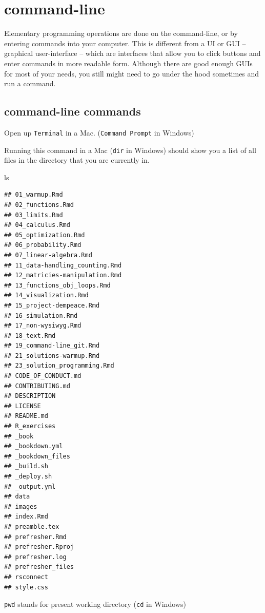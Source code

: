 \documentclass[
]{book}
\newenvironment{Shaded}{\begin{snugshade}}{\end{snugshade}}
\newcommand{\FunctionTok}[1]{\textcolor[rgb]{0.00,0.00,0.00}{#1}}
\theoremstyle{definition}
\theoremstyle{definition}
\theoremstyle{definition}
\theoremstyle{remark}
\begin{document}
\hypertarget{command-line}{%
\section{command-line}\label{command-line}}

Elementary programming operations are done on the command-line, or by entering commands into your computer. This is different from a UI or GUI -- graphical user-interface -- which are interfaces that allow you to click buttons and enter commands in more readable form. Although there are good enough GUIs for most of your needs, you still might need to go under the hood sometimes and run a command.

\hypertarget{command-line-commands}{%
\subsection{command-line commands}\label{command-line-commands}}

Open up \texttt{Terminal} in a Mac. (\texttt{Command\ Prompt} in Windows)

Running this command in a Mac (\texttt{dir} in Windows) should show you a list of all files in the directory that you are currently in.

\begin{Shaded}
\begin{Highlighting}[]
\FunctionTok{ls}
\end{Highlighting}
\end{Shaded}

\begin{verbatim}
## 01_warmup.Rmd
## 02_functions.Rmd
## 03_limits.Rmd
## 04_calculus.Rmd
## 05_optimization.Rmd
## 06_probability.Rmd
## 07_linear-algebra.Rmd
## 11_data-handling_counting.Rmd
## 12_matricies-manipulation.Rmd
## 13_functions_obj_loops.Rmd
## 14_visualization.Rmd
## 15_project-dempeace.Rmd
## 16_simulation.Rmd
## 17_non-wysiwyg.Rmd
## 18_text.Rmd
## 19_command-line_git.Rmd
## 21_solutions-warmup.Rmd
## 23_solution_programming.Rmd
## CODE_OF_CONDUCT.md
## CONTRIBUTING.md
## DESCRIPTION
## LICENSE
## README.md
## R_exercises
## _book
## _bookdown.yml
## _bookdown_files
## _build.sh
## _deploy.sh
## _output.yml
## data
## images
## index.Rmd
## preamble.tex
## prefresher.Rmd
## prefresher.Rproj
## prefresher.log
## prefresher_files
## rsconnect
## style.css
\end{verbatim}

\texttt{pwd} stands for present working directory (\texttt{cd} in Windows)
\end{document}
